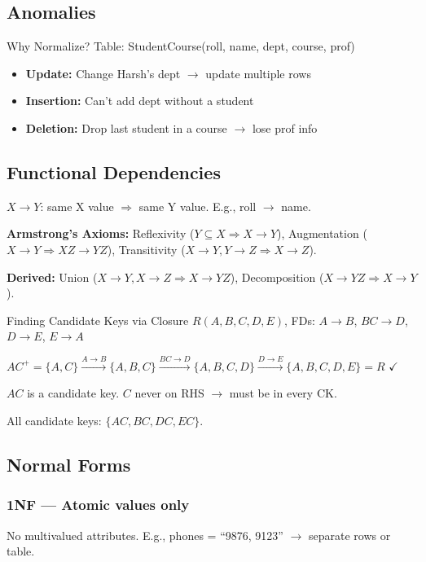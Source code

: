 \documentclass[12pt,a4paper]{article}
\begin{document}
\subsection{Anomalies}
\begin{warningbox}{Why Normalize?}
Table: StudentCourse(roll, name, dept, course, prof)

\begin{itemize}[leftmargin=*]
    \item \textbf{Update:} Change Harsh's dept $\to$ update multiple rows
    \item \textbf{Insertion:} Can't add dept without a student
    \item \textbf{Deletion:} Drop last student in a course $\to$ lose prof info
\end{itemize}
\end{warningbox}

\subsection{Functional Dependencies}
$X \to Y$: same X value $\Rightarrow$ same Y value. E.g., roll $\to$ name.

\textbf{Armstrong's Axioms:}
Reflexivity ($Y \subseteq X \Rightarrow X \to Y$), Augmentation ($X \to Y \Rightarrow XZ \to YZ$), Transitivity ($X \to Y, Y \to Z \Rightarrow X \to Z$).

\textbf{Derived:} Union ($X \to Y, X \to Z \Rightarrow X \to YZ$), Decomposition ($X \to YZ \Rightarrow X \to Y$).

\begin{examplebox}{Finding Candidate Keys via Closure}
$R(A,B,C,D,E)$, FDs: $A \to B$, $BC \to D$, $D \to E$, $E \to A$

$AC^+ = \{A,C\} \xrightarrow{A \to B} \{A,B,C\} \xrightarrow{BC \to D} \{A,B,C,D\} \xrightarrow{D \to E} \{A,B,C,D,E\} = R$ $\checkmark$

$AC$ is a candidate key. $C$ never on RHS $\to$ must be in every CK.

All candidate keys: $\{AC, BC, DC, EC\}$.
\end{examplebox}

\subsection{Normal Forms}

\subsubsection{1NF --- Atomic values only}
No multivalued attributes. E.g., phones = ``9876, 9123'' $\to$ separate rows or table.
\end{document}
